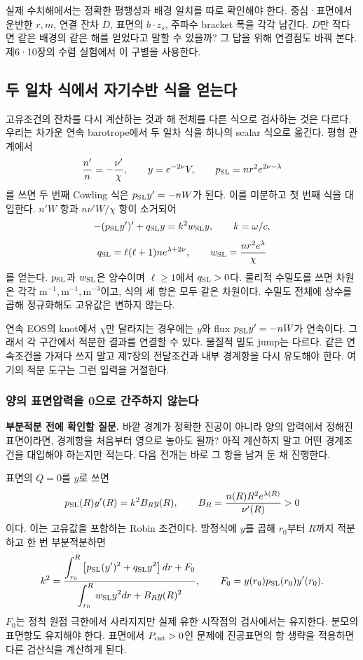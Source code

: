 \documentclass[
  10pt,
  a4paper,
]{article}
\begin{document}
실제 수치해에서는 정확한 평행성과 배경 일치를 따로 확인해야 한다.
중심·표면에서 운반한 \(r,m\), 연결 잔차 \(D\), 표면의 \(b\cdot z_s\),
주파수 bracket 폭을 각각 남긴다. \(D\)만 작다면 같은 배경의 같은 해를
얻었다고 말할 수 있을까? 그 답을 위해 연결점도 바꿔 본다. 제6·10장의
수렴 실험에서 이 구별을 사용한다.

\subsection{두 일차 식에서 자기수반 식을
얻는다}\label{uxb450-uxc77cuxcc28-uxc2dduxc5d0uxc11c-uxc790uxae30uxc218uxbc18-uxc2dduxc744-uxc5bbuxb294uxb2e4}

고유조건의 잔차를 다시 계산하는 것과 해 전체를 다른 식으로 검사하는 것은
다르다. 우리는 차가운 연속 barotrope에서 두 일차 식을 하나의 scalar
식으로 옮긴다. 평형 관계에서 \[
\frac{n'}{n}=-\frac{\nu'}{\chi},\qquad
y=e^{-2\nu}V,\qquad
p_{\rm SL}=nr^2e^{2\nu-\lambda}
\] 를 쓰면 두 번째 Cowling 식은 \(p_{\rm SL}y'=-nW\)가 된다. 이를
미분하고 첫 번째 식을 대입한다. \(n'W\) 항과 \(n\nu'W/\chi\) 항이
소거되어 \[
-(p_{\rm SL}y')'+q_{\rm SL}y=k^2w_{\rm SL}y,
\qquad k=\omega/c,
\] \[
q_{\rm SL}=\ell(\ell+1)n e^{\lambda+2\nu},\qquad
w_{\rm SL}=\frac{nr^2e^\lambda}{\chi}
\] 를 얻는다. \(p_{\rm SL}\)과 \(w_{\rm SL}\)은 양수이며
\(\ell\ge1\)에서 \(q_{\rm SL}>0\)다. 물리적 수밀도를 쓰면 차원은 각각
\(\mathrm{m^{-1}},\mathrm{m^{-1}},\mathrm{m^{-3}}\)이고, 식의 세 항은
모두 같은 차원이다. 수밀도 전체에 상수를 곱해 정규화해도 고유값은 변하지
않는다.

연속 EOS의 knot에서 \(\chi\)만 달라지는 경우에는 \(y\)와 flux
\(p_{\rm SL}y'=-nW\)가 연속이다. 그래서 각 구간에서 적분한 결과를 연결할
수 있다. 물질적 밀도 jump는 다르다. 같은 연속조건을 가져다 쓰지 말고
제7장의 전달조건과 내부 경계항을 다시 유도해야 한다. 여기의 적분 도구는
그런 입력을 거절한다.

\subsubsection{양의 표면압력을 0으로 간주하지
않는다}\label{uxc591uxc758-uxd45cuxba74uxc555uxb825uxc744-0uxc73cuxb85c-uxac04uxc8fcuxd558uxc9c0-uxc54auxb294uxb2e4}

\textbf{부분적분 전에 확인할 질문.} 바깥 경계가 정확한 진공이 아니라
양의 압력에서 정해진 표면이라면, 경계항을 처음부터 영으로 놓아도 될까?
아직 계산하지 말고 어떤 경계조건을 대입해야 하는지만 적는다. 다음 전개는
바로 그 항을 남겨 둔 채 진행한다.

표면의 \(Q=0\)를 \(y\)로 쓰면 \[
p_{\rm SL}(R)y'(R)=k^2B_Ry(R),\qquad
B_R=\frac{n(R)R^2e^{\lambda(R)}}{\nu'(R)}>0
\] 이다. 이는 고유값을 포함하는 Robin 조건이다. 방정식에 \(y\)를 곱해
\(r_0\)부터 \(R\)까지 적분하고 한 번 부분적분하면 \[
k^2=
\frac{\displaystyle\int_{r_0}^{R}
\left[p_{\rm SL}(y')^2+q_{\rm SL}y^2\right]dr+F_0}
{\displaystyle\int_{r_0}^{R}w_{\rm SL}y^2dr+B_Ry(R)^2},
\qquad F_0=y(r_0)p_{\rm SL}(r_0)y'(r_0).
\] \(F_0\)는 정칙 원점 극한에서 사라지지만 실제 유한 시작점의 검사에서는
유지한다. 분모의 표면항도 유지해야 한다. 표면에서 \(P_{\rm cut}>0\)인
문제에 진공표면의 항 생략을 적용하면 다른 검산식을 계산하게 된다.
\end{document}
